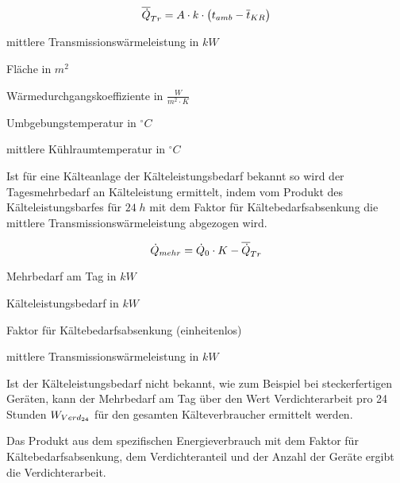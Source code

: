 \begin{equation}
	\aptrans = A \cdot k \cdot \left( t_{amb} -
	\overline{t}_{KR} \right) \label{aptrans}
\end{equation}

\begin{description}[\dth]

	\item[$\aptrans$] mittlere Transmissionswärmeleistung in $kW$
	\item[$A$] Fläche in $m^2$
	\item[$k$] Wärmedurchgangskoeffiziente in $\frac{W}{m^2 \cdot K}$
	\item[$t_{amb}$] Umbgebungstemperatur in $^{\circ}C$
	\item[$\overline{t}_{KR}$] mittlere Kühlraumtemperatur in
		$^{\circ}C$
\end{description}
\vspace{0.5cm}

Ist f\"ur eine K\"alteanlage der K\"alteleistungsbedarf bekannt so wird der
Tagesmehrbedarf an K\"alteleistung ermittelt, indem vom Produkt des
K\"alteleistungsbarfes f\"ur $24\;h$ mit dem Faktor f\"ur
K\"altebedarfsabsenkung die mittlere Transmissionswärmeleistung abgezogen wird.

\begin{equation}
	\pmehr = \pkalt \cdot K - \aptrans
\label{pmehr}
\end{equation}

\begin{description}[\dth]

	\item[$\pmehr$] Mehrbedarf am Tag in $kW$
	\item[$\pkalt$] Kälteleistungsbedarf in $kW$
	\item[$K$] Faktor für Kältebedarfsabsenkung (einheitenlos)
	\item[$\aptrans$] mittlere Transmissionswärmeleistung in $kW$

\end{description}
\vspace{0.5cm}

Ist der Kälteleistungsbedarf nicht bekannt, wie zum Beispiel bei steckerfertigen
Geräten, kann der Mehrbedarf am Tag \"uber den Wert Verdichterarbeit pro 24
Stunden ${W}_{Verd_{24}}$ für den gesamten Kälteverbraucher ermittelt werden.

Das Produkt aus dem spezifischen Energieverbrauch mit dem Faktor für
Kältebedarfsabsenkung, dem Verdichteranteil und der Anzahl der Geräte ergibt die
Verdichterarbeit.

